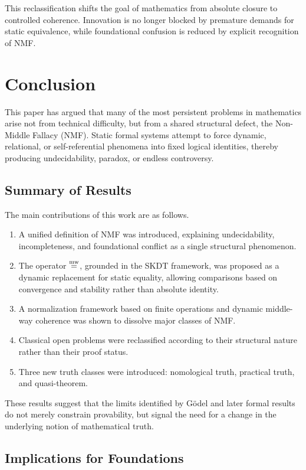 \documentclass[11pt]{article}
\begin{document}
This reclassification shifts the goal of mathematics from absolute
closure to controlled coherence.
Innovation is no longer blocked by premature demands for static
equivalence, while foundational confusion is reduced by explicit
recognition of NMF.

\section{Conclusion}

This paper has argued that many of the most persistent problems in
mathematics arise not from technical difficulty, but from a shared
structural defect, the Non-Middle Fallacy (NMF).
Static formal systems attempt to force dynamic, relational, or
self-referential phenomena into fixed logical identities, thereby
producing undecidability, paradox, or endless controversy.

\subsection{Summary of Results}

The main contributions of this work are as follows.

\begin{enumerate}
 \item A unified definition of NMF was introduced, explaining
 undecidability, incompleteness, and foundational conflict as a single
 structural phenomenon.
 \item The operator $\mathrel{\overset{\mathrm{mw}}{=}}$, grounded in the SKDT framework, was proposed as a dynamic replacement for
 static equality, allowing comparisons based on convergence and
 stability rather than absolute identity.
 \item A normalization framework based on finite operations and
 dynamic middle-way coherence was shown to dissolve major classes of
 NMF.
 \item Classical open problems were reclassified according to their
 structural nature rather than their proof status.
 \item Three new truth classes were introduced: nomological truth,
 practical truth, and quasi-theorem.
\end{enumerate}

These results suggest that the limits identified by Gödel and later
formal results do not merely constrain provability, but signal the need
for a change in the underlying notion of mathematical truth.

\subsection{Implications for Foundations}
\end{document}
